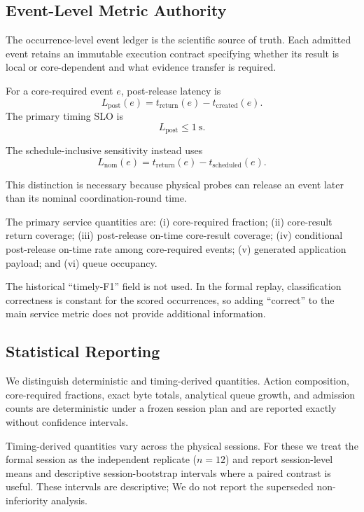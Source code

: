 \documentclass[10pt,journal]{IEEEtran}
\begin{document}
\subsection{Event-Level Metric Authority}

The occurrence-level event ledger is the scientific source of truth.
Each admitted event retains an immutable execution contract specifying
whether its result is local or core-dependent and what evidence transfer
is required.

For a core-required event $e$, post-release latency is
\begin{equation}
L_{\mathrm{post}}(e)
=
t_{\mathrm{return}}(e)
-
t_{\mathrm{created}}(e).
\label{eq:postlat}
\end{equation}
The primary timing SLO is
\begin{equation}
L_{\mathrm{post}}\leq1~\mathrm{s}.
\end{equation}

The schedule-inclusive sensitivity instead uses
\begin{equation}
L_{\mathrm{nom}}(e)
=
t_{\mathrm{return}}(e)
-
t_{\mathrm{scheduled}}(e).
\label{eq:nomlat}
\end{equation}

This distinction is necessary because physical probes can release an
event later than its nominal coordination-round time.

The primary service quantities are:
(i) core-required fraction;
(ii) core-result return coverage;
(iii) post-release on-time core-result coverage;
(iv) conditional post-release on-time rate among core-required events;
(v) generated application payload; and
(vi) queue occupancy.

The historical ``timely-F1'' field is not used. In the formal replay,
classification correctness is constant for the scored occurrences, so
adding ``correct'' to the main service metric does not provide additional
information.

\subsection{Statistical Reporting}

We distinguish deterministic and timing-derived quantities.
Action composition, core-required fractions, exact byte totals,
analytical queue growth, and admission counts are deterministic under a
frozen session plan and are reported exactly without confidence
intervals.

Timing-derived quantities vary across the physical sessions. For these
we treat the formal session as the independent replicate ($n=12$) and
report session-level means and descriptive session-bootstrap intervals
where a paired contrast is useful. These intervals are descriptive;
We do not report the superseded non-inferiority analysis.
\end{document}
